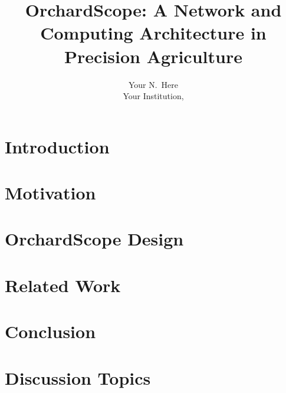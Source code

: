 \documentclass[letterpaper,twocolumn,10pt]{article}
\begin{document}
\title{\Large \bf OrchardScope: A Network and Computing Architecture in Precision Agriculture}


\newcommand\fatima[1]{\textcolor{magenta}{Fatima: #1}}
\newcommand\noman[1]{\textcolor{green}{Noman: #1}}

\author{
{\rm Your N.\ Here}\\
Your Institution,
} %




\maketitle

\begin{abstract}

\end{abstract}

\section{Introduction}


\section{Motivation}


\section{OrchardScope Design}

\label{design}

% 

\section{Related Work}

\label{related}

\section{Conclusion}

\label{conclusion}

\section{Discussion Topics}

\label{discussion}



\end{document}
